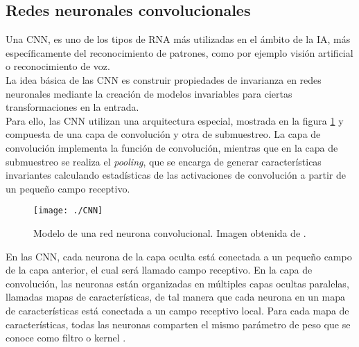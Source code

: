\documentclass[a4paper, 12pt, oneside]{book}
\begin{document}
\subsection{Redes neuronales convolucionales}\label{CNN_section}

\begin{comment}
Uno de los tipos más populares de redes neuronales profundas son las conocidas como redes neuronales convolucionales (CNN). Las CNN eliminan la necesidad de una extracción de características manual, por lo que no es necesario identificar las características utilizadas para clasificar las imágenes. La CNN funciona mediante la extracción de características directamente de las imágenes. Las características relevantes no se entrenan previamente; se aprenden mientras la red se entrena con una colección de imágenes.\\
\end{comment}

Una CNN, es uno de los tipos de RNA más utilizadas en el ámbito de la IA, más específicamente del reconocimiento de patrones, como por ejemplo visión artificial o reconocimiento de voz.\\

La idea básica de las CNN es construir propiedades de invarianza en redes neuronales mediante la creación de modelos invariables para ciertas transformaciones en la entrada.\\

Para ello, las CNN utilizan una arquitectura especial, mostrada en la figura \ref{ModeloCNN} y compuesta de una capa de convolución y otra de submuestreo. La capa de convolución implementa la función de convolución, mientras que en la capa de submuestreo se realiza el \textit{pooling}, que se encarga de generar características invariantes calculando estadísticas de las activaciones de convolución a partir de un pequeño campo receptivo. 

\begin{figure}[H]
\begin{center}
\texttt{[image: ./CNN]}
\caption{Modelo de una red neurona convolucional. Imagen obtenida de \cite{CNN}.}
\label{ModeloCNN}
\end{center}
\end{figure}

En las CNN, cada neurona de la capa oculta está conectada a un pequeño campo de la capa anterior, el cual será llamado campo receptivo. En la capa de convolución, las neuronas están organizadas en múltiples capas ocultas paralelas, llamadas mapas de características,  de tal manera que cada neurona en un mapa de características está conectada a un campo receptivo local. Para cada mapa de características, todas las neuronas comparten el mismo parámetro de peso que se conoce como filtro o kernel \cite{CNN}.
\end{document}
